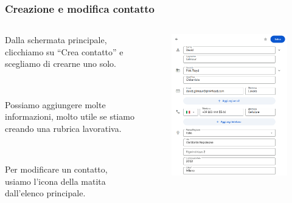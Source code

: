 \documentclass[]{beamer}
\begin{document}
\begin{frame}
\frametitle{Creazione e modifica contatto}
\begin{columns}
  \begin{column}{.4\textwidth}
    Dalla schermata principale, clicchiamo su ``Crea contatto'' e scegliamo di crearne uno solo.\pause

    ~
    
    Possiamo aggiungere molte informazioni, molto utile se stiamo creando una \alert{rubrica lavorativa}.\pause

    ~

    Per modificare un contatto, usiamo l'icona della matita dall'elenco principale.
  \end{column}
  \begin{column}{.5\textwidth}
    \begin{figure}
      \includegraphics[width=\columnwidth]{img/nuovocontatto.png}
    \end{figure}
  \end{column}
\end{columns}
\end{frame}
\end{document}

